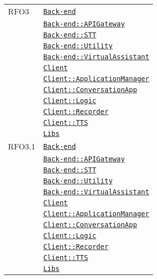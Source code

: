 \begin{longtable}{|>{\centering}m{3cm}|m{10cm}<{\centering}|}
RFO3 & \hyperref[Back-end]{\texttt{Back-end}}\\
& \hyperref[Back-end::APIGateway]{\texttt{Back-end::APIGateway}}\\
& \hyperref[Back-end::STT]{\texttt{Back-end::STT}}\\
& \hyperref[Back-end::Utility]{\texttt{Back-end::Utility}}\\
& \hyperref[Back-end::VirtualAssistant]{\texttt{Back-end::VirtualAssistant}}\\
& \hyperref[Client]{\texttt{Client}}\\
& \hyperref[Client::ApplicationManager]{\texttt{Client::ApplicationManager}}\\
& \hyperref[Client::ConversationApp]{\texttt{Client::ConversationApp}}\\
& \hyperref[Client::Logic]{\texttt{Client::Logic}}\\
& \hyperref[Client::Recorder]{\texttt{Client::Recorder}}\\
& \hyperref[Client::TTS]{\texttt{Client::TTS}}\\
& \hyperref[Libs]{\texttt{Libs}}\\ \hline

RFO3.1 & \hyperref[Back-end]{\texttt{Back-end}}\\
& \hyperref[Back-end::APIGateway]{\texttt{Back-end::APIGateway}}\\
& \hyperref[Back-end::STT]{\texttt{Back-end::STT}}\\
& \hyperref[Back-end::Utility]{\texttt{Back-end::Utility}}\\
& \hyperref[Back-end::VirtualAssistant]{\texttt{Back-end::VirtualAssistant}}\\
& \hyperref[Client]{\texttt{Client}}\\
& \hyperref[Client::ApplicationManager]{\texttt{Client::ApplicationManager}}\\
& \hyperref[Client::ConversationApp]{\texttt{Client::ConversationApp}}\\
& \hyperref[Client::Logic]{\texttt{Client::Logic}}\\
& \hyperref[Client::Recorder]{\texttt{Client::Recorder}}\\
& \hyperref[Client::TTS]{\texttt{Client::TTS}}\\
& \hyperref[Libs]{\texttt{Libs}}\\ \hline


\end{longtable}
